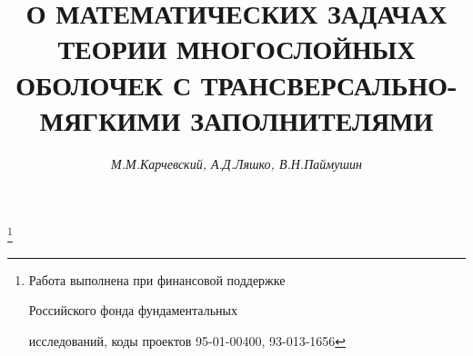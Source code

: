 














\newcommand{\divv}{\operatorname{div}}


\newcommand{\Ker}{\operatorname{Ker}}


\newcommand{\const}{\operatorname{const}}





\setcounter{page}{66}








\author{\it М.М.Карчевский, А.Д.Ляшко, В.Н.Паймушин }


\title{О МАТЕМАТИЧЕСКИХ ЗАДАЧАХ ТЕОРИИ МНОГОСЛОЙНЫХ \\


ОБОЛОЧЕК С ТРАНСВЕРСАЛЬНО-МЯГКИМИ ЗАПОЛНИТЕЛЯМИ}





\thanks{Работа выполнена при финансовой поддержке 


Российского фонда фундаментальных


исследований, коды проектов 95-01-00400, 93-013-1656}


\date{}


\pagestyle{plain}








\maketitle










